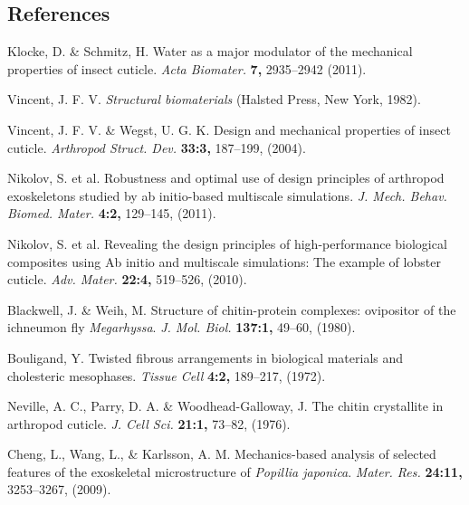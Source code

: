 \documentclass[twocolumn, linenumbers, superscriptaddress]{revtex4-1}
\begin{document}
	\begin{thebibliography}{50}
		\section*{References}	
				Klocke, D. \& Schmitz, H.
				Water as a major modulator of the mechanical properties of insect cuticle.
				\textit{Acta Biomater.}
				\textbf{7,}
				2935--2942
				(2011).
				
				Vincent, J. F. V.
				\textit{Structural biomaterials}
				(Halsted Press,
				New York,
				1982).
				
				Vincent, J. F. V. \& Wegst, U. G. K.
				Design and mechanical properties of insect cuticle.				
				\textit{Arthropod Struct. Dev.}
				\textbf{33:3,}
				187--199,
				(2004).
				
				Nikolov, S. et al.
				Robustness and optimal use of design principles of arthropod exoskeletons studied by ab initio-based multiscale simulations.
				\textit{J. Mech. Behav. Biomed. Mater.}
				\textbf{4:2,}
				129--145,
				(2011).
				
				Nikolov, S. et al.
				Revealing the design principles of high-performance biological composites using Ab initio and multiscale simulations: The example of lobster cuticle.
				\textit{Adv. Mater.}
				\textbf{22:4,}
				519--526,
				(2010).
				
				Blackwell, J. \& Weih, M.
				Structure of chitin-protein complexes: ovipositor of the ichneumon fly \textit{Megarhyssa}.
				\textit{J. Mol. Biol.}
				\textbf{137:1,}
				49--60,
				(1980).

				Bouligand, Y.
				Twisted fibrous arrangements in biological materials and cholesteric mesophases.
				\textit{Tissue Cell}
				\textbf{4:2,}
				189--217,
				(1972).
				
				Neville, A. C., Parry, D. A. \& Woodhead-Galloway, J.
				The chitin crystallite in arthropod cuticle.
				\textit{J. Cell Sci.}
				\textbf{21:1,}
				73--82,
				(1976).
				
				Cheng, L., Wang, L., \& Karlsson, A. M.
				Mechanics-based analysis of selected features of the exoskeletal microstructure of \textit{Popillia japonica}.
				\textit{Mater. Res.}
				\textbf{24:11,}
				3253--3267,
				(2009).
				

\end{thebibliography}
\end{document}
